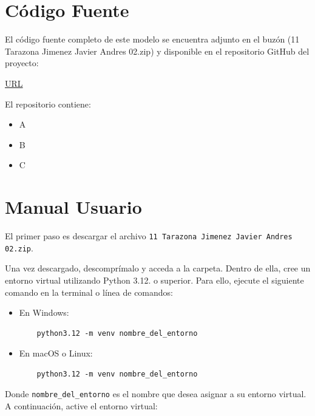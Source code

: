 \documentclass{article}
\begin{document}
\section{Código Fuente}\label{sec:cod}

El código fuente completo de este modelo se encuentra adjunto en el buzón
(11 Tarazona Jimenez Javier Andres 02.zip)
y disponible en el repositorio GitHub del proyecto:

\begin{center}
  \url{URL}
\end{center}

El repositorio contiene:
\begin{itemize}
  \item A
  \item B
  \item C
\end{itemize}


\section{Manual Usuario}\label{sec:man_u}

El primer paso es descargar el archivo \texttt{11 Tarazona Jimenez Javier Andres 02.zip}.

Una vez descargado, descomprímalo y acceda a la carpeta. Dentro de ella, cree un
entorno virtual utilizando Python 3.12. o superior. Para ello, ejecute el siguiente
comando en
la terminal o línea de comandos:

\begin{itemize}
  \item En Windows:
        \begin{verbatim}
    python3.12 -m venv nombre_del_entorno
  \end{verbatim}
  \item En macOS o Linux:
        \begin{verbatim}
    python3.12 -m venv nombre_del_entorno
  \end{verbatim}
\end{itemize}

Donde \texttt{nombre\_del\_entorno} es el nombre que desea asignar a su entorno virtual.
A continuación, active el entorno virtual:
\end{document}

